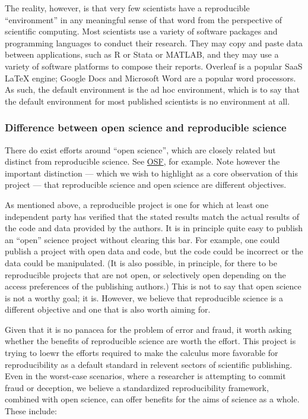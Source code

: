 The reality, however, is that very few scientists have a reproducible ``environment'' in any meaningful sense of that word from the perspective of scientific computing. Most scientists use a variety of software packages and programming languages to conduct their research. They may copy and paste data between applications, such as R or Stata or MATLAB, and they may use a variety of software platforms to compose their reports. Overleaf is a popular SaaS {\LaTeX}   engine; Google Docs and Microsoft Word are a popular word processors. As such, the default environment is the ad hoc environment, which is to say that the default environment for most published scientists is no environment at all.

\hypertarget{difference-between-open-science-and-reproducible-science}{%
\subsubsection{Difference between open science and reproducible science}\label{difference-between-open-science-and-reproducible-science}}

There do exist efforts around ``open science'', which are closely related but distinct from reproducible science. See \href{https://osf.io/tvyxz/}{OSF}, for example. Note however the important distinction --- which we wish to highlight as a core observation of this project --- that reproducible science and open science are different objectives.

As mentioned above, a reproducible project is one for which at least one independent party has verified that the stated results match the actual results of the code and data provided by the authors. It is in principle quite easy to publish an ``open'' science project without clearing this bar. For example, one could publish a project with open data and code, but the code could be incorrect or the data could be manipulated. (It is also possible, in principle, for there to be reproducible projects that are not open, or selectively open depending on the access preferences of the publishing authors.)
This is not to say that open science is not a worthy goal; it is. However, we believe that reproducible science is a different objective and one that is also worth aiming for.

Given that it is no panacea for the problem of error and fraud, it worth asking whether the benefits of reproducible science are worth the effort. This project is trying to loewr the efforts required to make the calculus more favorable for reproducibility as a default standard in relevent sectors of scientific publishing. 
Even in the worst-case scenarios, where a researcher is attempting to commit fraud or deception, we believe a standardized reproducibility framework, combined with open science, can offer benefits for the aims of science as a whole. These include:

